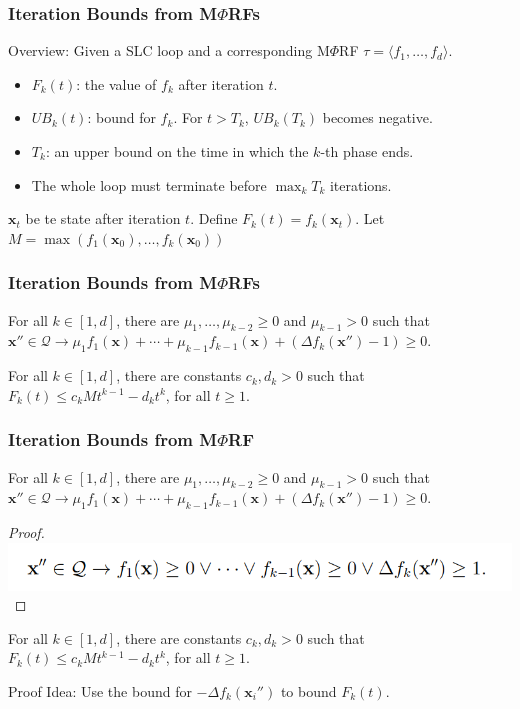 \documentclass[11pt]{beamer}
\newif\ifcomm\commfalse
\begin{document}
\begin{frame}\frametitle{Iteration Bounds from M$\Phi$RFs}
Overview:
Given a SLC loop and a corresponding M$\Phi$RF $\tau = \langle f_1, \ldots, f_d\rangle$.
\begin{itemize}
\item $F_k(t)$: the value of $f_k$ after iteration $t$.

\item $UB_k(t)$: bound for $f_k$. For $t > T_k$, $UB_k(T_k)$ becomes negative.

\item $T_k$: an upper bound on the time in which the $k$-th phase ends.

\item The whole loop must terminate before $\max_kT_k$ iterations.
\end{itemize}

$\textbf{x}_t$ be te state after iteration $t$. Define $F_k(t) = f_k(\textbf{x}_t)$. Let $M = \max(f_1(\textbf{x}_0), \ldots, f_k(\textbf{x}_0))$ 

\end{frame}
\begin{frame}\frametitle{Iteration Bounds from M$\Phi$RFs}
\begin{lemma}[4]
For all $k \in [1, d]$, there are $\mu_1, \ldots, \mu_{k - 2} \ge 0$ and $\mu_{k - 1} > 0$ such that $\textbf{x}''\in \mathcal{Q}\rightarrow \mu_1f_1(\textbf{x}) + \cdots + \mu_{k - 1}f_{k-1}(\textbf{x}) + (\Delta f_k(\textbf{x}'') - 1) \ge 0$.
\end{lemma}
\begin{lemma}[5]
For all $k \in [1, d]$, there are constants $c_k, d_k > 0$ such that $F_k(t) \le c_kMt^{k - 1}- d_kt^k$, for all $t \ge 1 $.
\end{lemma}
\end{frame}
\ifcomm
\begin{frame}\frametitle{Iteration Bounds from M$\Phi$RF}
\begin{lemma}[4]
For all $k \in [1, d]$, there are $\mu_1, \ldots, \mu_{k - 2} \ge 0$ and $\mu_{k - 1} > 0$ such that $\textbf{x}''\in \mathcal{Q}\rightarrow \mu_1f_1(\textbf{x}) + \cdots + \mu_{k - 1}f_{k-1}(\textbf{x}) + (\Delta f_k(\textbf{x}'') - 1) \ge 0$.
\end{lemma}
\begin{proof}
\includegraphics[scale=0.35]{13.png}
\end{proof}
\begin{lemma}[5]
For all $k \in [1, d]$, there are constants $c_k, d_k > 0$ such that $F_k(t) \le c_kMt^{k - 1}- d_kt^k$, for all $t \ge 1 $.
\end{lemma}
Proof Idea: Use the bound for $-\Delta f_k(\textbf{x}_i '')$ to bound $F_k(t)$.
\end{frame}
\end{document}
